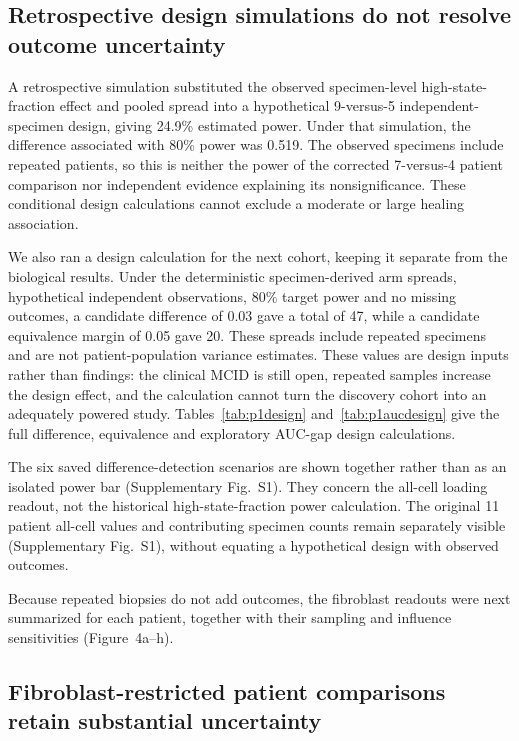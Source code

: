 \documentclass[10pt,a4paper]{article}
\begin{document}
\subsection{Retrospective design simulations do not resolve outcome uncertainty}

A retrospective simulation substituted the observed specimen-level high-state-fraction effect and pooled spread into a hypothetical 9-versus-5 independent-specimen design, giving 24.9\% estimated power. Under that simulation, the difference associated with 80\% power was 0.519. The observed specimens include repeated patients, so this is neither the power of the corrected 7-versus-4 patient comparison nor independent evidence explaining its nonsignificance. These conditional design calculations cannot exclude a moderate or large healing association.

We also ran a design calculation for the next cohort, keeping it separate from the biological results. Under the deterministic specimen-derived arm spreads, hypothetical independent observations, 80\% target power and no missing outcomes, a candidate difference of 0.03 gave a total of 47, while a candidate equivalence margin of 0.05 gave 20. These spreads include repeated specimens and are not patient-population variance estimates. These values are design inputs rather than findings: the clinical MCID is still open, repeated samples increase the design effect, and the calculation cannot turn the discovery cohort into an adequately powered study. Tables~\ref{tab:p1design} and~\ref{tab:p1aucdesign} give the full difference, equivalence and exploratory AUC-gap design calculations.

The six saved difference-detection scenarios are shown together rather than as an isolated power bar (Supplementary Fig.~S1). They concern the all-cell loading readout, not the historical high-state-fraction power calculation. The original 11 patient all-cell values and contributing specimen counts remain separately visible (Supplementary Fig.~S1), without equating a hypothetical design with observed outcomes.

Because repeated biopsies do not add outcomes, the fibroblast readouts were next summarized for each patient, together with their sampling and influence sensitivities (Figure~4a--h\label{call:p1f5}).

\subsection{Fibroblast-restricted patient comparisons retain substantial uncertainty}
\end{document}
